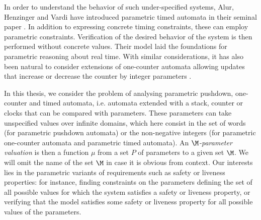 In order to 
understand the behavior of such under-specified systems, Alur, Henzinger and Vardi have introduced parametric timed automata in their seminal paper \cite{AHV93-stoc}.
In addition to expressing concrete timing constraints, these can employ parametric constraints. Verification of the desired behavior of the system is then performed without concrete values. 
Their model laid the foundations for parametric reasoning about real time. 
With similar considerations, it has also been natural to consider extensions of one-counter automata allowing updates that increase or decrease the counter by integer parameters \cite{IJTW93-icalp, BIL06-icalp}.

In this thesis, we consider the problem of analysing parametric pushdown, one-counter and timed automata, i.e. automata extended with a stack, counter or clocks that can be compared with parameters.
These parameters can take unspecified values over infinite domains, which here consist in the set of words (for parametric pushdown automata) or the non-negative integers (for parametric one-counter automata and parametric timed automata). 
%
%
%
%
An {\em $\M$-parameter valuation} is then a function $\mu$ from a set $P$ of parameters to a 
given set $\M$. We will omit the name of the set $\M$ in case it is obvious from context.
%
%
%
Our interests lies in the parametric variants of 
requirements such as safety or liveness properties: for instance, 
finding constraints on the parameters defining the set of all possible values for which the system satisfies a safety or liveness property, or verifying that the  
model satisfies some safety or liveness property for all possible values of the parameters.

